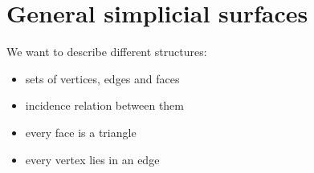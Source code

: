 \section{General simplicial surfaces}
\frame{\tableofcontents[currentsection]}

\begin{frame}{}
    We want to describe different structures:
    \begin{itemize}
        \item<4-> sets of vertices, edges and faces
        \item<5-> incidence relation between them
        \item<6-> every face is a triangle
        \item<7-> every vertex lies in an edge 
    \end{itemize}
\end{frame}


